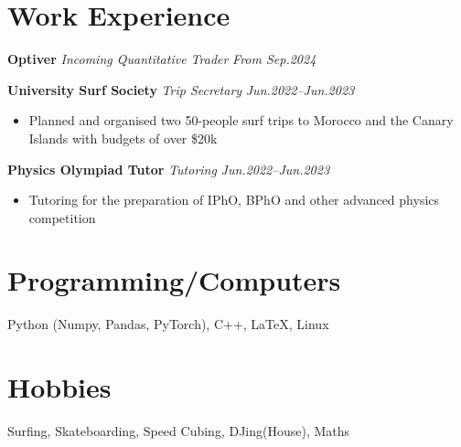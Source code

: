 \documentclass[11pt,a4paper,roman]{moderncv}        %
\begin{document}
\section{Work Experience}

\textbf{Optiver} \textit{Incoming Quantitative Trader} \hfill \textit{From Sep.2024}
\vspace*{3mm}

\textbf{University Surf Society} \textit{Trip Secretary} \hfill \textit{Jun.2022--Jun.2023}
\begin{itemize}
	\item Planned and organised two 50-people surf trips to Morocco and the Canary Islands with budgets of over \$20k
\end{itemize}
\vspace*{1mm}

\textbf{Physics Olympiad Tutor} \textit{Tutoring} \hfill \textit{Jun.2022--Jun.2023}
\begin{itemize}
	\item Tutoring for the preparation of IPhO, BPhO and other advanced physics competition
\end{itemize}
\section{Programming/Computers}
 {Python (Numpy, Pandas, PyTorch), C++, \LaTeX, Linux}

\section{Hobbies}
 {Surfing, Skateboarding, Speed Cubing, DJing(House), Maths}
\end{document}
